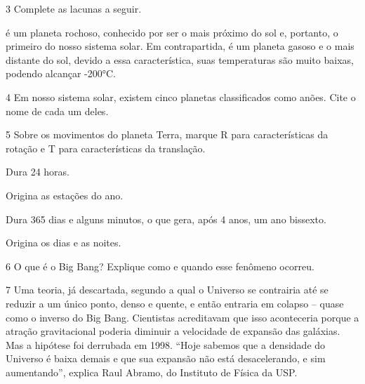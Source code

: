 \num{3}  Complete as lacunas a seguir.

\preencher é um planeta rochoso, conhecido por ser
o mais próximo do sol e, portanto, o primeiro do nosso sistema solar. Em
contrapartida, \preencher é um planeta gasoso e o mais distante
do sol, devido a essa característica, suas temperaturas são muito
baixas, podendo alcançar -200°C. 

\num{4}  Em nosso sistema solar, existem cinco planetas classificados como anões. Cite o nome de cada um deles.



\num{5}  Sobre os movimentos do planeta Terra, marque R para características da rotação e T para características da translação.

\begin{boxlist}
\item Dura 24 horas. 

\item Origina as estações do ano. 

\item Dura 365 dias e alguns minutos, o que gera, após 4 anos, um ano
bissexto. 

\item Origina os dias e as noites. 
\end{boxlist}

\num{6}  O que é o Big Bang? Explique como e quando esse fenômeno ocorreu.



\num{7}  Uma teoria, já descartada, segundo a qual o Universo se contrairia até
  se reduzir a um único ponto, denso e quente, e então entraria em
  colapso -- quase como o inverso do Big Bang. Cientistas acreditavam
  que isso aconteceria porque a atração gravitacional poderia diminuir a
  velocidade de expansão das galáxias. Mas a hipótese foi derrubada em
  1998. ``Hoje sabemos que a densidade do Universo é baixa demais e que
  sua expansão não está desacelerando, e sim aumentando'', explica Raul
  Abramo, do Instituto de Física da USP.


